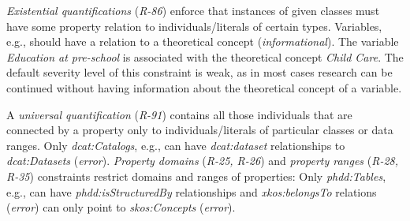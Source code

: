 \documentclass[conference]{IEEEtran}
\newenvironment{DL}{
  \small
  \vspace{0cm}
	\begin{center}
  \begin{tabular}{c l}

}{
  \end{tabular}
	\end{center}
}
\begin{document}
\emph{Existential quantifications} (\emph{R-86}) enforce that instances of given classes must have some property relation to individuals/literals of certain types.
Variables, e.g., should have a relation to a theoretical concept (\emph{informational}).
The variable \emph{Education at pre-school} is associated with the theoretical concept \emph{Child Care}. 
The default severity level of this constraint is weak, as in most cases research can be continued without having information about the theoretical concept of a variable.

A \emph{universal quantification} (\emph{R-91}) contains all those individuals that are connected by a property only to individuals/literals of particular classes  or data ranges.
Only \emph{dcat:Catalogs}, e.g., can have \emph{dcat:dataset} relationships to \emph{dcat:Datasets} (\emph{error}).
\emph{Property domains} (\emph{R-25, R-26}) and \emph{property ranges} (\emph{R-28, R-35}) constraints restrict domains and ranges of properties:
Only \emph{phdd:Tables}, e.g., can have \emph{phdd:isStructuredBy} relationships and
\emph{xkos:belongsTo} relations (\emph{error}) can only point to \emph{skos:Concepts} (\emph{error}).
\end{document}
